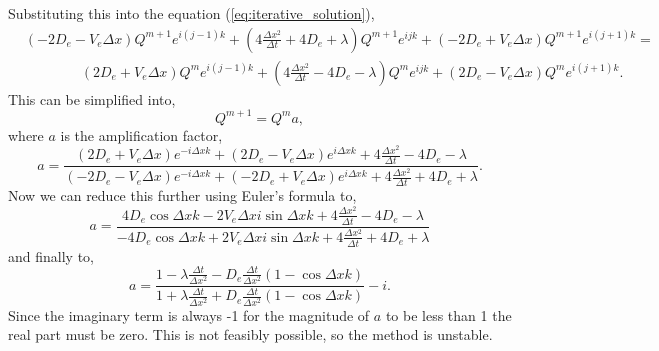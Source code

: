 \documentclass[11pt, letterpaper]{article}
\begin{document}
Substituting this into the equation (\ref{eq:iterative_solution}),
\[
    \begin{split}
        &(-2D_e - V_e\Delta x)Q^{m + 1}e^{i(j - 1)k} + \left(4\frac{\Delta x^2}{\Delta t} + 4D_e + \lambda\right)Q^{m + 1}e^{ijk} + (-2D_e + V_e \Delta x) Q^{m + 1}e^{i(j + 1)k} = \\
        &\qquad\qquad (2D_e + V_e\Delta x)Q^me^{i(j - 1)k} + \left(4\frac{\Delta x^2}{\Delta t} - 4D_e - \lambda\right)Q^me^{ijk} + (2D_e - V_e \Delta x) Q^me^{i(j + 1)k}.
    \end{split}
\]
This can be simplified into,
\[
    Q^{m + 1} = Q^m a,
\]
where $a$ is the amplification factor,
\[
    a = \frac{(2D_e + V_e\Delta x)e^{-i\Delta xk} + (2D_e - V_e\Delta x)e^{i\Delta xk} + 4\frac{\Delta x^2}{\Delta t} - 4D_e - \lambda}
    {(-2D_e - V_e\Delta x)e^{-i\Delta xk} + (-2D_e + V_e\Delta x)e^{i\Delta xk} + 4\frac{\Delta x^2}{\Delta t} + 4D_e + \lambda}.
\]
Now we can reduce this further using Euler's formula to,
\[
    a = \frac{4D_e\cos\Delta xk - 2V_e\Delta xi\sin \Delta x k + 4\frac{\Delta x^2}{\Delta t} - 4D_e - \lambda}
    {-4D_e\cos\Delta xk + 2V_e\Delta xi\sin \Delta x k + 4\frac{\Delta x^2}{\Delta t} + 4D_e + \lambda}
\]
and finally to,
\[
    a = \frac{1 - \lambda\frac{\Delta t}{\Delta x^2} - D_e\frac{\Delta t}{\Delta x^2} (1 - \cos\Delta x k)}
    {1 + \lambda\frac{\Delta t}{\Delta x^2} + D_e\frac{\Delta t}{\Delta x^2} (1 - \cos\Delta x k)} - i.
\]
Since the imaginary term is always -1 for the magnitude of $a$ to be less than 1 the real part must be zero.
This is not feasibly possible, so the method is unstable.
\end{document}
